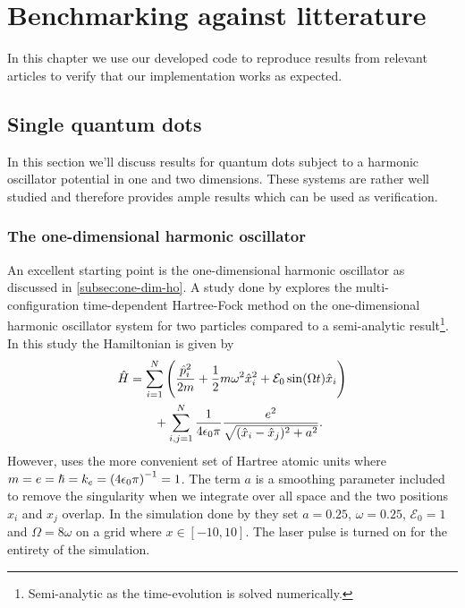 \chapter{Benchmarking against litterature}
    In this chapter we use our developed code to reproduce results from relevant
    articles to verify that our implementation works as expected.

    \section{Single quantum dots}
        In this section we'll discuss results for quantum dots subject to a
        harmonic oscillator potential in one and two dimensions.
        These systems are rather well studied and therefore provides ample
        results which can be used as verification.

        \subsection{The one-dimensional harmonic oscillator}
            An excellent starting point is the one-dimensional harmonic
            oscillator as discussed in \autoref{subsec:one-dim-ho}.
            A study done by \citeauthor{zanghellini_2004}
            \cite{zanghellini_2004, skattum2013time, kristiansen2017time}
            explores the multi-configuration time-dependent Hartree-Fock method
            on the one-dimensional harmonic oscillator system for two particles
            compared to a semi-analytic result\footnote{Semi-analytic as the
            time-evolution is solved numerically.}.
            In this study the Hamiltonian is given by
            \begin{align}
                \hat{H}
                &=
                \sum_{i = 1}^{N}
                \left( 
                    \frac{\hat{p}^2_i}{2m}
                    + \frac{1}{2} m \omega^2 \hat{x}^2_i
                    + \mathcal{E}_0 \sin(\Omega t)\hat{x}_i
                 \right)
                \nonumber \\
                &\qquad
                + \sum_{i, j = 1}^{N}
                \frac{1}{4\epsilon_0\pi}
                \frac{e^2}{\sqrt{(\hat{x}_i - \hat{x}_j)^2 + a^2}}.
            \end{align}
            However, \citeauthor{zanghellini_2004} uses the more convenient set
            of Hartree atomic units where $m = e = \hslash = k_e =
            \left( 4\epsilon_0\pi \right)^{-1} = 1$.
            The term $a$ is a smoothing parameter included to remove the
            singularity when we integrate over all space and the two positions
            $x_i$ and $x_j$ overlap. \cite{suq, zanghellini_2004}
            In the simulation done by \citeauthor{zanghellini_2004} they set $a
            = 0.25$, $\omega = 0.25$, $\mathcal{E}_0 = 1$ and $\Omega = 8\omega$
            on a grid where $x \in [-10, 10]$.
            The laser pulse is turned on for the entirety of the simulation.

